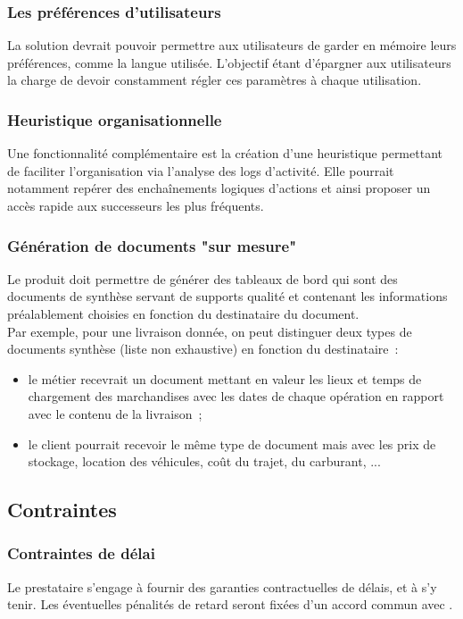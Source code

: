 \subsubsection{Les préférences d'utilisateurs}
La solution devrait pouvoir permettre aux utilisateurs de garder en mémoire leurs préférences, comme la langue utilisée. L'objectif étant d'épargner aux utilisateurs la charge de devoir constamment régler ces paramètres à chaque utilisation.

\subsubsection{Heuristique organisationnelle}
Une fonctionnalité complémentaire est la création d'une heuristique permettant de faciliter l'organisation via l'analyse des logs d'activité. Elle pourrait notamment repérer des enchaînements logiques d'actions et ainsi proposer un accès rapide aux successeurs les plus fréquents.

\subsubsection{Génération de documents "sur mesure"}
Le produit doit permettre de générer des \og{}tableaux de bord\fg{} qui sont des documents de synthèse servant de supports qualité et contenant les informations préalablement choisies en fonction du destinataire du document.
\\
Par exemple, pour une livraison donnée, on peut distinguer deux types de documents synthèse (liste non exhaustive) en fonction du destinataire~:
\begin{itemize}
\item le métier recevrait un document mettant en valeur les lieux et temps de chargement des marchandises avec les dates de chaque opération en rapport avec le contenu de la livraison~;
\item le client pourrait recevoir le même type de document mais avec les prix de stockage, location des véhicules, coût du trajet, du carburant, ...
\end{itemize}

\subsection{Contraintes}

\subsubsection{Contraintes de délai}
Le prestataire s'engage à fournir des garanties contractuelles de délais, et à s'y tenir. Les éventuelles pénalités de retard seront fixées d'un accord commun avec \mo.

